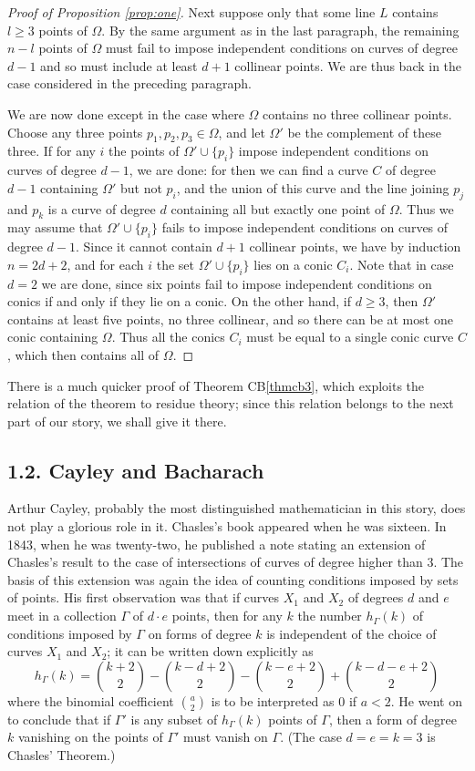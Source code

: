 \documentclass{bull-l}
\theoremstyle{pplain}
\theoremstyle{definition}
\begin{document}
\begin{proof}[Proof of Proposition \ref{prop:one}]
Next suppose only that some line $L$ contains $l\ge 3$ points of $\Omega$.  By
the same argument as in the last paragraph, the remaining $n-l$ points of $
\Omega$ must fail to impose independent conditions on curves of degree $d-1$
and so must include at least $d+1$ collinear points.  We are thus back in the
case considered in the preceding paragraph.

We are now done except in the case where $\Omega$ contains no three collinear 
points.  Choose any three points $p_1,p_2,p_3\in \Omega$, and let $\Omega'$ be
the complement of these three.  If for any $i$ the points of
$\Omega'\cup\{p_i\}$ impose independent conditions on curves of degree $d-1$,
we are done: for then we can find a curve $C$ of degree $d-1$ containing $
\Omega'$ but not $p_i$, and the union of this curve and the line joining $p_j$
and $p_k$ is a curve of degree $d$ containing all but exactly one point of $
\Omega$.  Thus we may assume that $\Omega'\cup\{p_i\}$ fails to impose
independent conditions on curves of degree $d-1$.  Since it cannot contain
$d+1$ collinear points, we have by induction $n=2d+2$, and for each $i$ the set
$\Omega'\cup\{p_i\}$ lies on a conic $C_i$.  Note that in case $d=2$ we are
done, since six points fail to impose independent conditions on conics if and
only if they lie on a conic.  On the other hand, if $d\ge 3$, then $\Omega'$
contains at least five points, no three collinear, and so there can be at most
one conic containing $\Omega$.  Thus all the conics $C_i$ must be equal to a
single conic curve $C$, which then contains all of $\Omega$.
\end{proof}

There is a much quicker proof of Theorem CB\ref{thmcb3}, which exploits the
relation of the theorem to residue theory; since this relation belongs to the
next part of our story, we shall give it there.

\subsection*{{\rm 1.2.} Cayley and Bacharach}
Arthur Cayley, probably the most distinguished mathematician in this story,
does not play a glorious role in it.  Chasles's book appeared when he was
sixteen.  In 1843, when he was twenty-two, he published a note stating an
extension of Chasles's result to the case of intersections of curves of degree
higher than 3.  The basis of this extension was again the idea of counting 
conditions imposed by sets of points.  His first observation was that if curves
$X_1$ and $X_2$ of degrees $d$ and $e$ meet in a collection $\Gamma$ of $d\cdot
e$ points, then for any $k$ the number $h_\Gamma(k)$ of conditions imposed by $
\Gamma$ on forms of degree $k$ is independent of the choice of curves $X_1$ and
$X_2$; it can be written down explicitly as
\[h_\Gamma(k)=\binom{k+2}{2} -\binom{k-d+2}{2}-\binom{k-e+2}{2}+\binom
{k-d-e+2}{2}\]
where the binomial coefficient $\binom{a}{2}$ is to be interpreted as 0 if
$a<2$.  He went on to conclude that if $\Gamma'$ is any subset of $h_\Gamma(k)$ 
points of $\Gamma$, then a form of degree $k$ vanishing on the points of $
\Gamma'$ must vanish on $\Gamma$.  (The case $d=e=k=3$ is Chasles' Theorem.)
\end{document}
